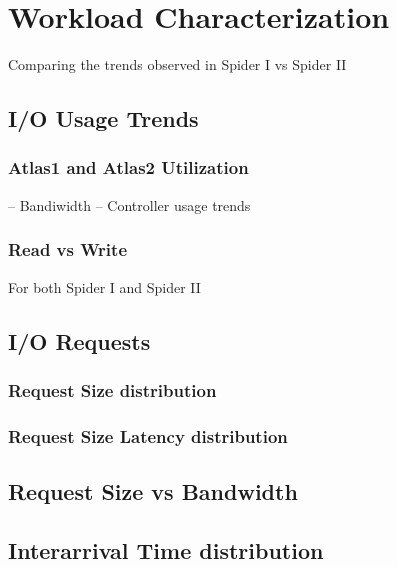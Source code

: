 \section{Workload Characterization}
\label{sec:workloadchar}

Comparing the trends observed in Spider I vs Spider II

\subsection{I/O Usage Trends}
\subsubsection{Atlas1 and Atlas2 Utilization}
-- Bandiwidth
-- Controller usage trends

\subsubsection{Read vs Write}
For both Spider I and Spider II

\subsection{I/O Requests}
\subsubsection{Request Size distribution}
\subsubsection{Request Size Latency distribution}

\subsection{Request Size vs Bandwidth}

\subsection{Interarrival Time distribution}
 

